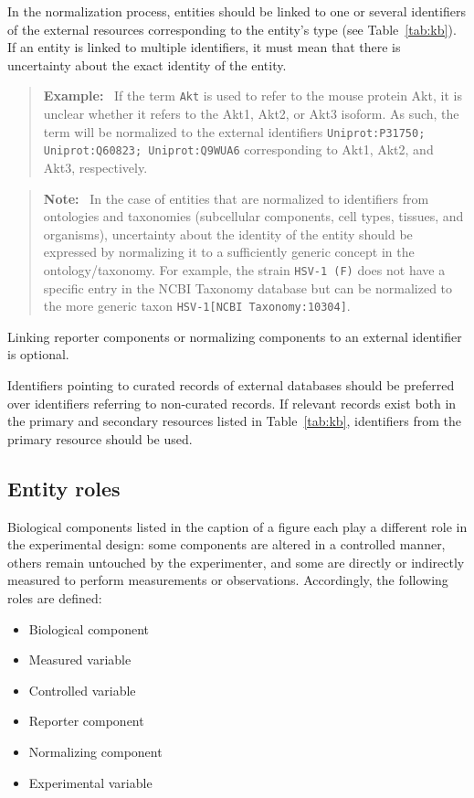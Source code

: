 \documentclass{bioinfo}
\newenvironment{note}
{\par\color{black}\begin{quote}\textbf{Note:}\ }
{\end{quote}\par}
\newenvironment{example}
{\par\color{black}\begin{quote}\textbf{Example:}\ }
{\end{quote}\par}
\begin{document}
In the normalization process, entities should be linked to one or several identifiers of the external resources corresponding to the entity's type (see Table~\ref{tab:kb}). If an entity is linked to multiple identifiers, it must mean that there is uncertainty about the exact identity of the entity.

\begin{example}
    If the term \texttt{Akt} is used to refer to the mouse protein Akt, it is unclear whether it refers to the Akt1, Akt2, or Akt3 isoform. As such, the term will be normalized to the external identifiers \texttt{Uniprot:P31750; Uniprot:Q60823; Uniprot:Q9WUA6} corresponding to Akt1, Akt2, and Akt3, respectively.
\end{example}

\begin{note}
    In the case of entities that are normalized to identifiers from ontologies and taxonomies (subcellular components, cell types, tissues, and organisms), uncertainty about the identity of the entity should be expressed by normalizing it to a sufficiently generic concept in the ontology/taxonomy. For example, the strain \texttt{HSV-1 (F)} does not have a specific entry in the NCBI Taxonomy database but can be normalized to the more generic taxon \texttt{HSV-1[NCBI Taxonomy:10304]}.
\end{note}

Linking reporter components or normalizing components to an external identifier is optional.

Identifiers pointing to curated records of external databases should be preferred over identifiers referring to non-curated records. If relevant records exist both in the primary and secondary resources listed in Table~\ref{tab:kb}, identifiers from the primary resource should be used.

\subsection{Entity roles}\label{app:entity-roles}

Biological components listed in the caption of a figure each play a different role in the experimental design: some components are altered in a controlled manner, others remain untouched by the experimenter, and some are directly or indirectly measured to perform measurements or observations. Accordingly, the following roles are defined:
\begin{itemize}
    \item Biological component
    \item Measured variable
    \item Controlled variable
    \item Reporter component
    \item Normalizing component
    \item Experimental variable
\end{itemize}
\end{document}
